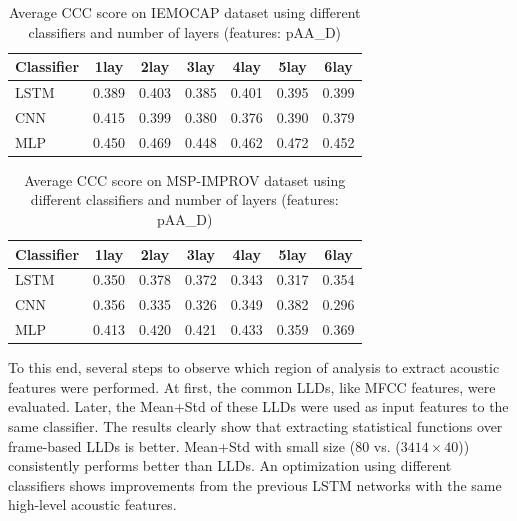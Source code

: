 \begin{table} [!htbp]
\caption{Average CCC score on IEMOCAP dataset using different classifiers and
number of layers (features: pAA\_D)}
    \begin{center}
    \begin{tabular}{l | c c c c c c}
      \hline 
Classifier &   1lay & 2lay  & 3lay  & 4lay  & 5lay  & 6lay  \\
\hline \hline
LSTM  & 0.389 & 0.403 & 0.385 & 0.401 & 0.395 & 0.399 \\
CNN   & 0.415 & 0.399 & 0.380 & 0.376 & 0.390 & 0.379 \\
MLP   & 0.450 & 0.469 & 0.448 & 0.462 & 0.472 & 0.452 \\
      \hline
    \end{tabular}
    \label{tab:iemocap-optim}
  \end{center}
\end{table}

\begin{table}[!htbp]
\caption{Average CCC score on MSP-IMPROV dataset using different classifiers
and number of layers (features: pAA\_D)}
  \begin{center}
  \begin{tabular}{l | c c c c c c}
    \hline 
Classifier &   1lay & 2lay  & 3lay  & 4lay  & 5lay  & 6lay  \\
\hline \hline
LSTM & 0.350  & 0.378 & 0.372 & 0.343 & 0.317 & 0.354 \\
CNN  & 0.356  & 0.335 & 0.326 & 0.349 & 0.382 & 0.296 \\
MLP  & 0.413  & 0.420 & 0.421 & 0.433 & 0.359 & 0.369 \\
    \hline
  \end{tabular}
  \label{tab:improv-optim}
\end{center}
\end{table}

To this end, several steps to observe which region of analysis to extract
acoustic features were performed. At first, the common LLDs, like MFCC
features, were evaluated. Later, the Mean+Std of these LLDs were used as input
features to the same classifier. The results clearly show that extracting
statistical functions over frame-based LLDs is better. Mean+Std with small size
($80$ vs. ($3414 \times 40$)) consistently performs better than LLDs. An
optimization using different classifiers shows improvements from the previous
LSTM networks with the same high-level acoustic features. 

